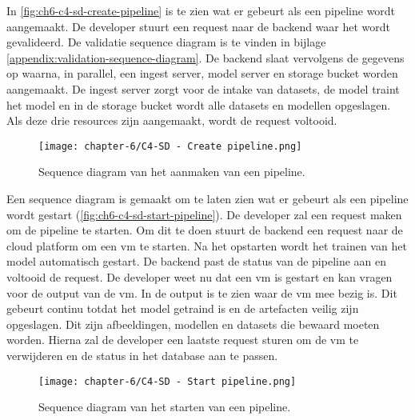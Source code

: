 In \autoref{fig:ch6-c4-sd-create-pipeline} is te zien wat er gebeurt als een pipeline wordt aangemaakt. De developer stuurt een request naar de backend waar het wordt gevalideerd. De validatie sequence diagram is te vinden in bijlage \ref{appendix:validation-sequence-diagram}. De backend slaat vervolgens de gegevens op waarna, in parallel, een ingest server, model server en storage bucket worden aangemaakt. De ingest server zorgt voor de intake van datasets, de model traint het model en in de storage bucket wordt alle datasets en modellen opgeslagen. Als deze drie resources zijn aangemaakt, wordt de request voltooid.

\begin{figure}[hbt!]
  \centering
  \texttt{[image: chapter-6/C4-SD - Create pipeline.png]}
  \caption{Sequence diagram van het aanmaken van een pipeline.}
  \label{fig:ch6-c4-sd-create-pipeline}
\end{figure}

\newpage

Een sequence diagram is gemaakt om te laten zien wat er gebeurt als een pipeline wordt gestart (\autoref{fig:ch6-c4-sd-start-pipeline}). De developer zal een request maken om de pipeline te starten. Om dit te doen stuurt de backend een request naar de cloud platform om een \acrfull{vm} te starten. Na het opstarten wordt het trainen van het model automatisch gestart. De backend past de status van de pipeline aan en voltooid de request. De developer weet nu dat een \acrshort{vm} is gestart en kan vragen voor de output van de \acrshort{vm}. In de output is te zien waar de \acrshort{vm} mee bezig is. Dit gebeurt continu totdat het model getraind is en de artefacten veilig zijn opgeslagen. Dit zijn afbeeldingen, modellen en datasets die bewaard moeten worden. Hierna zal de developer een laatste request sturen om de \acrshort{vm} te verwijderen en de status in het database aan te passen. 

\begin{figure}[hbt!]
  \centering
  \texttt{[image: chapter-6/C4-SD - Start pipeline.png]}
  \caption{Sequence diagram van het starten van een pipeline.}
  \label{fig:ch6-c4-sd-start-pipeline}
\end{figure}

